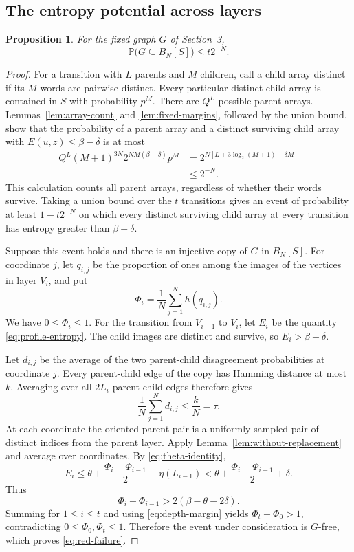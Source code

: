 \documentclass[11pt,leqno]{amsart}
\numberwithin{equation}{section}
\newtheorem{proposition}[theorem]{Proposition}
\theoremstyle{definition}
\theoremstyle{remark}
\newcommand{\Prob}{\mathbb P}
\begin{document}
\subsection{The entropy potential across layers}

\begin{proposition}\label{prop:red-free}
For the fixed graph $G$ of Section~3,
\begin{equation}\label{eq:red-failure}
 \Prob\bigl(G\subseteq B_N[S]\bigr)\le t2^{-N}.
\end{equation}
\end{proposition}

\begin{proof}
For a transition with $L$ parents and $M$ children, call a child array distinct if its $M$ words are pairwise distinct. Every particular distinct child array is contained in $S$ with probability $p^M$. There are $Q^L$ possible parent arrays. Lemmas~\ref{lem:array-count} and \ref{lem:fixed-margins}, followed by the union bound, show that the probability of a parent array and a distinct surviving child array with $E(u,z)\le\beta-\delta$ is at most
\begin{align*}
 Q^L(M+1)^{3N}2^{NM(\beta-\delta)}p^M
 &=2^{N[L+3\log_2(M+1)-\delta M]}\\
 &\le2^{-N}.
\end{align*}
This calculation counts all parent arrays, regardless of whether their words survive. Taking a union bound over the $t$ transitions gives an event of probability at least $1-t2^{-N}$ on which every distinct surviving child array at every transition has entropy greater than $\beta-\delta$.

Suppose this event holds and there is an injective copy of $G$ in $B_N[S]$. For coordinate $j$, let $q_{i,j}$ be the proportion of ones among the images of the vertices in layer $V_i$, and put
\[
 \Phi_i=\frac1N\sum_{j=1}^N h(q_{i,j}).
\]
We have $0\le\Phi_i\le1$. For the transition from $V_{i-1}$ to $V_i$, let $E_i$ be the quantity \eqref{eq:profile-entropy}. The child images are distinct and survive, so $E_i>\beta-\delta$.

Let $d_{i,j}$ be the average of the two parent-child disagreement probabilities at coordinate $j$. Every parent-child edge of the copy has Hamming distance at most $k$. Averaging over all $2L_i$ parent-child edges therefore gives
\[
 \frac1N\sum_{j=1}^N d_{i,j}\le\frac{k}{N}=\tau.
\]
At each coordinate the oriented parent pair is a uniformly sampled pair of distinct indices from the parent layer. Apply Lemma~\ref{lem:without-replacement} and average over coordinates. By \eqref{eq:theta-identity},
\[
 E_i\le\theta+\frac{\Phi_i-\Phi_{i-1}}2+\eta(L_{i-1})
 <\theta+\frac{\Phi_i-\Phi_{i-1}}2+\delta.
\]
Thus
\[
 \Phi_i-\Phi_{i-1}>2(\beta-\theta-2\delta).
\]
Summing for $1\le i\le t$ and using \eqref{eq:depth-margin} yields $\Phi_t-\Phi_0>1$, contradicting $0\le\Phi_0,\Phi_t\le1$. Therefore the event under consideration is $G$-free, which proves \eqref{eq:red-failure}.
\end{proof}
\end{document}
